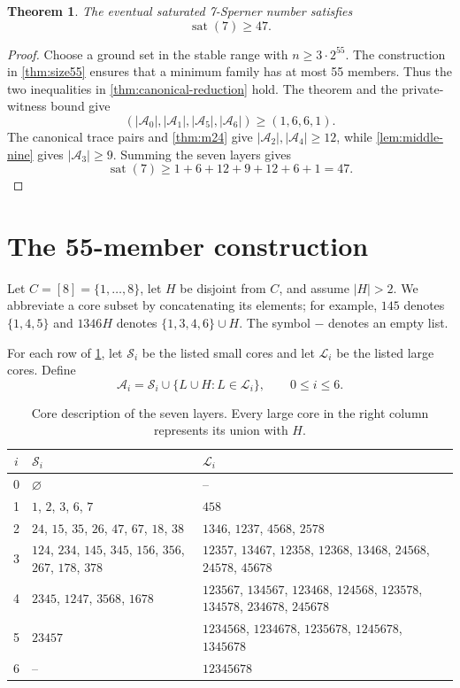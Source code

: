 \documentclass[11pt]{article}
\newtheorem{theorem}{Theorem}[section]
\theoremstyle{definition}
\theoremstyle{remark}
\newcommand{\smallcores}{\mathcal{S}}
\newcommand{\largecores}{\mathcal{L}}
\newcommand{\sat}{\operatorname{sat}}
\begin{document}
\begin{theorem}
\label{thm:sat7-lower}
The eventual saturated 7-Sperner number satisfies
\[
  \sat(7)\geq47.
\]
\end{theorem}

\begin{proof}
Choose a ground set in the stable range with $n\geq3\cdot2^{55}$.  The
construction in \cref{thm:size55} ensures that a minimum family has at most
55 members.  Thus the two inequalities in \cref{thm:canonical-reduction}
hold.  The theorem and the private-witness bound give
\[
  (|\mathcal A_0|,|\mathcal A_1|,|\mathcal A_5|,
  |\mathcal A_6|)\geq(1,6,6,1).
\]
The canonical trace pairs and \cref{thm:m24} give
$|\mathcal A_2|,|\mathcal A_4|\geq12$, while
\cref{lem:middle-nine} gives $|\mathcal A_3|\geq9$.  Summing the seven layers
gives
\[
  \sat(7)\geq1+6+12+9+12+6+1=47.
\]
\end{proof}

\section{The 55-member construction}
\label{sec:construction}

Let $C=[8]=\{1,\ldots,8\}$, let $H$ be disjoint from $C$, and assume
$|H|>2$.  We abbreviate a core subset by concatenating its elements; for
example, $145$ denotes $\{1,4,5\}$ and $1346H$ denotes
$\{1,3,4,6\}\cup H$.  The symbol $-$ denotes an empty list.

For each row of \cref{tab:layers}, let $\smallcores_i$ be the listed small
cores and let $\largecores_i$ be the listed large cores.  Define
\[
  \mathcal A_i
   =\smallcores_i\cup\{L\cup H:L\in\largecores_i\},
  \qquad 0\leq i\leq6.
\]

\begin{table}[htbp]
\centering
\small
\setlength{\tabcolsep}{4pt}
\renewcommand{\arraystretch}{1.18}
\begin{tabular}{c p{} p{}}
\toprule
$i$ & $\smallcores_i$ & $\largecores_i$ \\
\midrule
0 & $\varnothing$ & -- \\
1 & $1$, $2$, $3$, $6$, $7$ & $458$ \\
2 & $24$, $15$, $35$, $26$, $47$, $67$, $18$, $38$
  & $1346$, $1237$, $4568$, $2578$ \\
3 & $124$, $234$, $145$, $345$, $156$, $356$, $267$, $178$, $378$
  & $12357$, $13467$, $12358$, $12368$, $13468$, $24568$, $24578$, $45678$ \\
4 & $2345$, $1247$, $3568$, $1678$
  & $123567$, $134567$, $123468$, $124568$, $123578$, $134578$, $234678$, $245678$ \\
5 & $23457$
  & $1234568$, $1234678$, $1235678$, $1245678$, $1345678$ \\
6 & -- & $12345678$ \\
\bottomrule
\end{tabular}
\caption{Core description of the seven layers.  Every large core in the
right column represents its union with $H$.}
\label{tab:layers}
\end{table}
\end{document}
